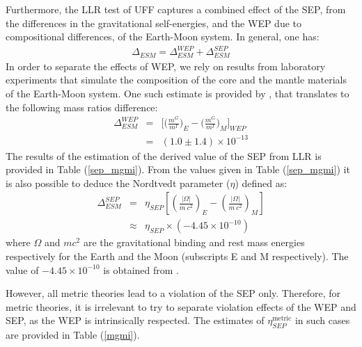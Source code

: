 \documentclass[fleqn,usenatbib,referee]{mnras}
\begin{document}
Furthermore, the LLR test of UFF captures a combined effect of the SEP, from the differences in the gravitational self-energies, and the WEP due to compositional differences, of the Earth-Moon system. In general, one has:
\begin{eqnarray}
\label{sep_wep}
\Delta_{ESM} =\Delta_{ESM}^{WEP} + \Delta_{ESM}^{SEP}
\end{eqnarray}
In order to separate the effects of WEP, we rely on results from laboratory experiments that simulate the composition of the core and the mantle materials of the Earth-Moon system. One such estimate is provided by \cite{Adelberger2001}, that translates to the following mass ratios difference:
 \begin{eqnarray}
  \label{WEP_Adelberge}
 \Delta_{ESM}^{WEP}&=&  \Big[\Big(\frac{m^G}{m^I}\Big)_{E} - \Big(\frac{m^G}{m^I}\Big)_{M}\Big]_{WEP} \\ &=& (1.0 \pm 1.4) \times 10^{-13} 
  \end{eqnarray}
The results of the estimation of the derived value of the SEP from LLR is provided in Table (\ref{sep_mgmi}). From the values given in Table (\ref{sep_mgmi}) it is also possible to deduce the Nordtvedt parameter ($\eta$) defined as:
\begin{eqnarray}
  \label{eta_sep_1}
  \Delta_{ESM}^{SEP} &=& \eta_{SEP} \left[\left(\frac{|\Omega|}{m~c^2}\right)_E - \left(\frac{|\Omega|}{m~c^2}\right)_M\right] \\ &\approx&  \eta_{SEP} \times (-4.45 \times 10^{-10})
  \end{eqnarray}
where $\Omega$ and $m c^2$ are the gravitational binding and rest mass energies respectively for the Earth and the Moon (subscripts E and M respectively). The value of $-4.45 \times 10^{-10}$ is obtained from \citet[Eqn. 7]{Williams2009}.

However, all metric theories lead to a violation of the SEP only. Therefore, for metric theories, it is irrelevant to try to separate violation effects of the WEP and SEP, as the WEP is intrinsically respected. The estimates of $\eta_{SEP}^\mathrm{metric}$ in such cases are provided in Table (\ref{mgmi}).
\end{document}
